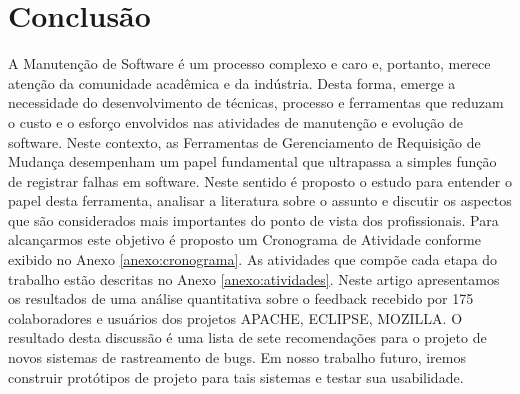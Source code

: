 \chapter{Conclusão}
\label{ch:conclusao_trab_futuros}

A Manutenção de Software é um processo complexo e caro e, portanto,  merece
atenção da comunidade acadêmica e da indústria. Desta forma, emerge a
necessidade do desenvolvimento de técnicas, processo e ferramentas que reduzam o
custo e o esforço envolvidos nas atividades de manutenção e evolução de
software. Neste contexto, as Ferramentas de Gerenciamento de Requisição de
Mudança desempenham um papel fundamental que ultrapassa a simples função de
registrar falhas em software. Neste sentido é proposto o estudo para entender o
papel desta ferramenta, analisar a literatura sobre o assunto e discutir os
aspectos que são considerados mais importantes do ponto de vista dos
profissionais. Para alcançarmos este objetivo é proposto um Cronograma de
Atividade conforme exibido no Anexo \ref{anexo:cronograma}. As atividades que
compõe cada etapa do trabalho estão descritas no Anexo \ref{anexo:atividades}.
Neste artigo apresentamos os resultados de uma análise quantitativa sobre o
feedback recebido por 175 colaboradores e usuários dos projetos APACHE, ECLIPSE,
MOZILLA\@. O resultado desta discussão é uma lista de sete recomendações para o
projeto de novos sistemas de rastreamento de bugs. Em nosso trabalho futuro,
iremos construir protótipos de projeto para tais sistemas e testar sua
usabilidade.
